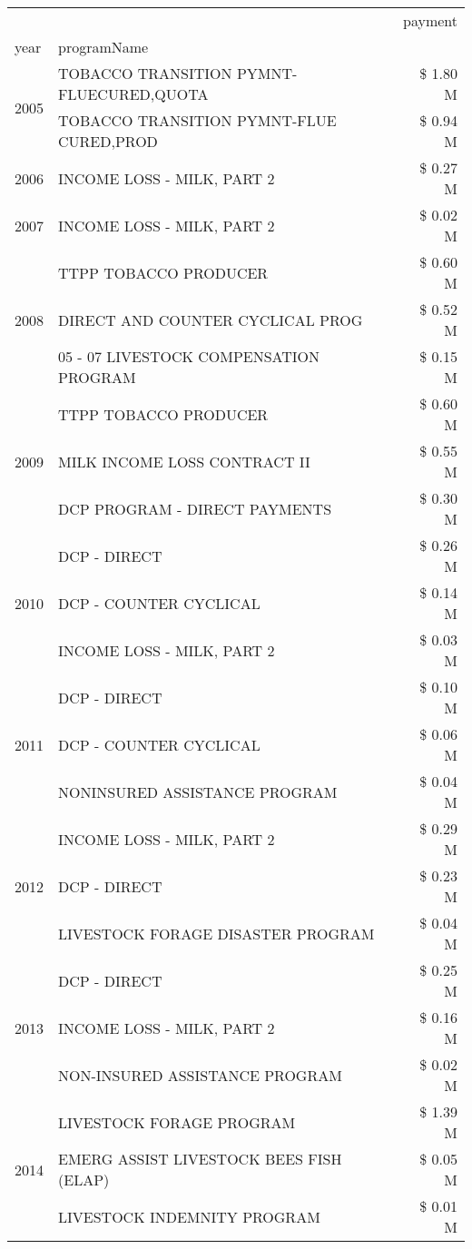 \begin{tabular}{llr}
\toprule
 &  & payment \\
year & programName &  \\
\midrule
\multirow[t]{2}{*}{2005} & TOBACCO TRANSITION PYMNT-FLUECURED,QUOTA & \$ 1.80 M \\
 & TOBACCO TRANSITION PYMNT-FLUE CURED,PROD & \$ 0.94 M \\
\cline{1-3}
2006 & INCOME LOSS - MILK, PART 2 & \$ 0.27 M \\
\cline{1-3}
2007 & INCOME LOSS - MILK, PART 2 & \$ 0.02 M \\
\cline{1-3}
\multirow[t]{3}{*}{2008} & TTPP TOBACCO PRODUCER & \$ 0.60 M \\
 & DIRECT AND COUNTER CYCLICAL PROG & \$ 0.52 M \\
 & 05 - 07 LIVESTOCK COMPENSATION PROGRAM & \$ 0.15 M \\
\cline{1-3}
\multirow[t]{3}{*}{2009} & TTPP TOBACCO PRODUCER & \$ 0.60 M \\
 & MILK INCOME LOSS CONTRACT II & \$ 0.55 M \\
 & DCP PROGRAM - DIRECT PAYMENTS & \$ 0.30 M \\
\cline{1-3}
\multirow[t]{3}{*}{2010} & DCP - DIRECT & \$ 0.26 M \\
 & DCP - COUNTER CYCLICAL & \$ 0.14 M \\
 & INCOME LOSS - MILK, PART 2 & \$ 0.03 M \\
\cline{1-3}
\multirow[t]{3}{*}{2011} & DCP - DIRECT & \$ 0.10 M \\
 & DCP - COUNTER CYCLICAL & \$ 0.06 M \\
 & NONINSURED ASSISTANCE PROGRAM & \$ 0.04 M \\
\cline{1-3}
\multirow[t]{3}{*}{2012} & INCOME LOSS - MILK, PART 2 & \$ 0.29 M \\
 & DCP - DIRECT & \$ 0.23 M \\
 & LIVESTOCK FORAGE DISASTER PROGRAM & \$ 0.04 M \\
\cline{1-3}
\multirow[t]{3}{*}{2013} & DCP - DIRECT & \$ 0.25 M \\
 & INCOME LOSS - MILK, PART 2 & \$ 0.16 M \\
 & NON-INSURED ASSISTANCE PROGRAM & \$ 0.02 M \\
\cline{1-3}
\multirow[t]{3}{*}{2014} & LIVESTOCK FORAGE PROGRAM & \$ 1.39 M \\
 & EMERG ASSIST LIVESTOCK BEES FISH (ELAP) & \$ 0.05 M \\
 & LIVESTOCK INDEMNITY PROGRAM & \$ 0.01 M \\

\end{tabular}
